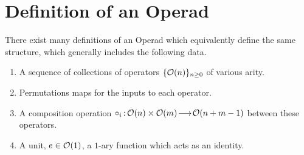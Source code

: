




\section{Definition of an Operad}
There exist many definitions of an Operad which equivalently define the same structure, which generally includes the following data. 
\begin{enumerate}
    \item A sequence of collections of operators \( \{ \mathcal{O}(n) \}_{n \ge 0} \) of various arity.
    \item Permutations maps for the inputs to each operator. 
    \item A composition operation \( \circ_i \,{:}\,\mathcal{O}(n) \times \mathcal{O}(m)\!\longrightarrow\!\mathcal{O}(n + m - 1)\) between these operators.
    \item A unit, \( e \in \mathcal{O}(1) \), a \( 1 \)-ary function which acts as an identity.  
\end{enumerate}

